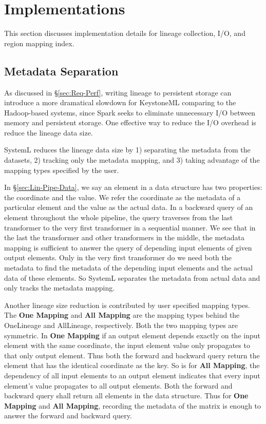 \documentclass{sig-alternate}
\begin{document}
\section{Implementations}
\label{sec:Impl}
This section discusses implementation details for lineage collection, I/O, and region mapping index.

\subsection{Metadata Separation}
As discussed in \S\ref{sec:Req-Perf}, writing lineage to persistent storage can introduce a more dramatical slowdown for KeystoneML comparing
to the Hadoop-based systems, since Spark seeks to eliminate unnecessary I/O between memory and persistent storage.
One effective way to reduce the I/O overhead is reduce the lineage data size.

SystemL reduces the lineage data size by 1) separating the metadata from the datasets, 2) tracking only the metadata mapping, 
and 3) taking advantage of the mapping types specified by the user.

In \S\ref{sec:Lin-Pipe-Data}, we say an element in a data structure has two properties: the coordinate and the value.
We refer the coordinate as the metadata of a particular element and the value as the actual data. 
In a backward query of an element throughout the whole pipeline, the query traverses from the last transformer
to the very first transformer in a sequential manner. 
We see that in the last the transformer and other transformers in the middle, the metadata mapping is sufficient to answer
the query of depending input elements of given output elements. Only in the very first transformer do we need both the metadata
to find the metadata of the depending input elements and the actual data of these elements.
So SystemL separates the metadata from actual data and only tracks the metadata mapping.

Another lineage size reduction is contributed by user specified mapping types. 
The {\bf One Mapping} and {\bf All Mapping} are the mapping types behind the OneLineage and AllLineage, respectively.
Both the two mapping types are symmetric.
In {\bf One Mapping} if an output element depends exactly on the input element with the same coordinate, 
the input element value only propagates to that only output element. 
Thus both the forward and backward query return the element that has the identical coordinate as the key.
So is for {\bf All Mapping}, the dependency of all input elements to an output element indicates that every input element's value propagates to all output elements.
Both the forward and backward query shall return all elements in the data structure.
Thus for {\bf One Mapping} and {\bf All Mapping}, recording the metadata of the matrix is enough to answer the forward and backward query.
\end{document}
